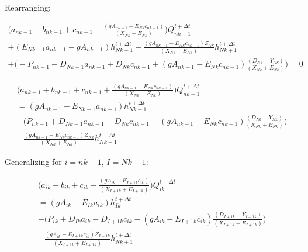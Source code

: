\documentclass[11pt]{article}
\begin{document}
Rearranging:

\begin{equation}
  \begin{split}
    \biggl(a_{nk - 1} + b_{nk - 1} + c_{nk - 1} + \frac{( g A_{nk - 1} - E_{Nk} c_{nk - 1} )}{(X_{Nk} + E_{Nk})} \biggr)  Q_{nk - 1}^{t + \Delta t} \\ + (E_{Nk - 1} a_{nk - 1} - g A_{nk -1}) h_{Nk - 1}^{t + \Delta t} - \frac{( g A_{nk - 1} - E_{Nk} c_{nk - 1} ) Z_{Nk}}{(X_{Nk} + E_{Nk})} h_{Nk + 1}^{t + \Delta t}  
   \\ + \biggl( - P_{nk - 1} - D_{Nk - 1} a_{nk - 1}   + D_{Nk} c_{nk - 1} + ( g A_{nk - 1} - E_{Nk} c_{nk - 1} ) \frac{( D_{Nk} - Y_{Nk})}{(X_{Nk} + E_{Nk})} \biggr) = 0 
  \end{split}
\end{equation}

\begin{equation}
  \begin{split}
    \biggl(a_{nk - 1} + b_{nk - 1} + c_{nk - 1} + \frac{( g A_{nk - 1} - E_{Nk} c_{nk - 1} )}{(X_{Nk} + E_{Nk})} \biggr)  Q_{nk - 1}^{t + \Delta t} \\ = ( g A_{nk -1} - E_{Nk - 1} a_{nk - 1}) h_{Nk - 1}^{t + \Delta t} \\ + \biggl( P_{nk - 1} + D_{Nk - 1} a_{nk - 1}   - D_{Nk} c_{nk - 1} - ( g A_{nk - 1} - E_{Nk} c_{nk - 1} ) \frac{( D_{Nk} - Y_{Nk})}{(X_{Nk} + E_{Nk})} \biggr) \\ + \frac{( g A_{nk - 1} - E_{Nk} c_{nk - 1} ) Z_{Nk}}{(X_{Nk} + E_{Nk})} h_{Nk + 1}^{t + \Delta t}
  \end{split}
\end{equation}

Generalizing for $i = nk - 1$, $I = Nk - 1$:

\begin{equation}
  \begin{split}
    \biggl(a_{ik} + b_{ik} + c_{ik} + \frac{( g A_{ik} - E_{I + 1k} c_{ik} )}{(X_{I + 1k} + E_{I + 1k})} \biggr)  Q_{ik}^{t + \Delta t} \\ = ( g A_{ik} - E_{Ik} a_{ik}) h_{Ik}^{t + \Delta t} \\ + \biggl( P_{ik} + D_{Ik} a_{ik}   - D_{I + 1k} c_{ik} - ( g A_{ik} - E_{I + 1k} c_{ik} ) \frac{( D_{I + 1k} - Y_{I + 1k})}{(X_{I + 1k} + E_{I + 1k})} \biggr) \\ + \frac{( g A_{ik} - E_{I + 1k} c_{ik} ) Z_{I + 1k}}{(X_{I + 1k} + E_{I + 1k})} h_{Nk + 1}^{t + \Delta t}
  \end{split}
\end{equation}
\end{document}
